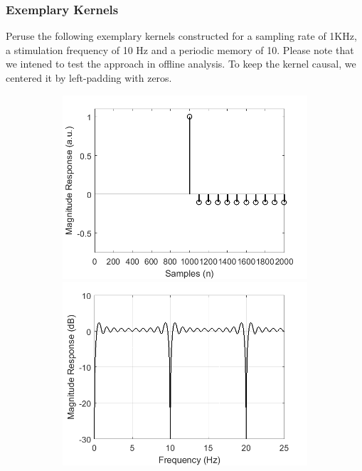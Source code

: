\documentclass[a4paper]{article}
\begin{document}
\subsubsection{Exemplary Kernels}
Peruse the following exemplary kernels constructed for a sampling rate of 1KHz, a stimulation frequency of 10 Hz and a periodic memory of 10.  Please note that we intened to test the approach in offline analysis. To keep the kernel causal, we centered it by left-padding with zeros.




\begin{figure}[hbtp]
    \begin{subfigure}{.245\textwidth}
        \includegraphics[width=\textwidth]{img/kernel_ave.png}\\
        \includegraphics[width=\textwidth]{img/mag_ave.png}

\end{subfigure}
\end{figure}
\end{document}
